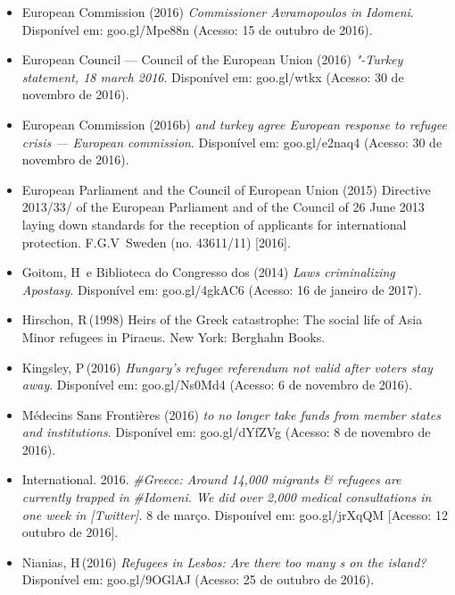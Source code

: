 \begin{itemize}
{  on emergency relocation}. Disponível em: goo.gl/{WJ}0{RTK} (Acesso: 8 de
  novembro de 2016).
\item
  European Commission (2016) \emph{Commissioner Avramopoulos in
  Idomeni}. Disponível em: goo.gl/Mpe88n (Acesso: 15 de outubro de
  2016).
\item
  European Council --- Council of the European Union (2016)
  \emph{"-Turkey statement, 18 march 2016}. Disponível em:
  goo.gl/wtkx (Acesso: 30 de novembro de 2016).
\item
  European Commission (2016b) \emph{ and turkey agree European
  response to refugee crisis --- European commission}. Disponível em:
  goo.gl/e2naq4 (Acesso: 30 de novembro de 2016).
\item
  European Parliament and the Council of European Union (2015) Directive
  2013/33/ of the European Parliament and of the Council of 26 June
  2013 laying down standards for the reception of applicants for
  international protection. F.G.V\, Sweden (no. 43611/11) {[}2016{]}.
\item
  Goitom, H\, e Biblioteca do Congresso dos  (2014) \emph{Laws
  criminalizing Apostasy}. Disponível em: goo.gl/4gk{AC}6 (Acesso: 16 de
  janeiro de 2017).
\item
  Hirschon, R\,(1998) Heirs of the Greek catastrophe: The social life of
  Asia Minor refugees in Piraeus. New York: Berghahn Books.
\item
  Kingsley, P\,(2016) \emph{Hungary}\emph{'}\emph{s refugee referendum
  not valid after voters stay away}. Disponível em: goo.gl/Ns0Md4
  (Acesso: 6 de novembro de 2016).
\item
  Médecins Sans Frontières (2016) \emph{ to no longer take funds from
   member states and institutions}. Disponível em:
  goo.gl/dYfZVg
  (Acesso: 8 de novembro de 2016).
\item
   International. 2016.
  \emph{{\#Greece}}\emph{:
  Around 14,000 migrants \& refugees are currently trapped in}
  \emph{{\#Idomeni}}\emph{.
  We did over 2,000 medical consultations in one week in
   [Twitter]. }8 de março. Disponível em: goo.gl/jrXq{QM} {[}Acesso:
  12 outubro de 2016{]}.
\item
  Nianias, H\,(2016) \emph{Refugees in Lesbos: Are there too many s
  on the island?} Disponível em: goo.gl/9{OG}l{AJ} (Acesso: 25 de outubro de
  2016).

\end{itemize}
